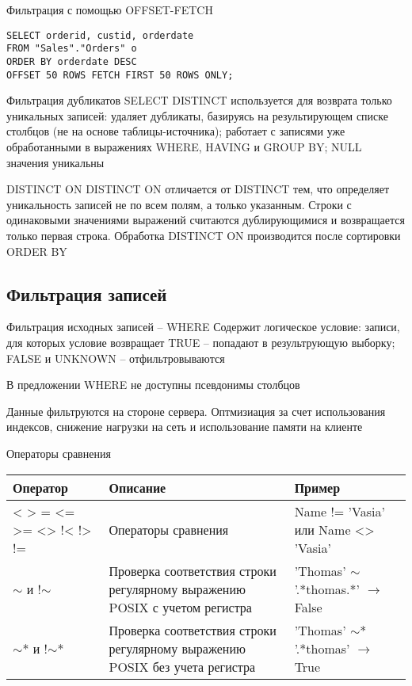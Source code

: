 \documentclass[12pt]{article}
\begin{document}
\begin{Example}{Фильтрация с помощью OFFSET-FETCH}
\begin{lstlisting}
SELECT orderid, custid, orderdate 
FROM "Sales"."Orders" o 
ORDER BY orderdate DESC 
OFFSET 50 ROWS FETCH FIRST 50 ROWS ONLY;
\end{lstlisting}
\end{Example}

\begin{nota}{Фильтрация дубликатов}
    SELECT DISTINCT используется для возврата только уникальных записей: удаляет дубликаты, базируясь на результирующем списке столбцов (не на основе таблицы-источника); работает с записями уже обработанными в выражениях WHERE, HAVING и GROUP BY; NULL значения уникальны 
\end{nota}

\begin{defin}{DISTINCT ON}
    DISTINCT ON отличается от DISTINCT тем, что определяет уникальность записей не по всем полям, а только указанным. Строки с одинаковыми значениями выражений считаются дублирующимися и возвращается только первая строка. Обработка DISTINCT ON производится после сортировки ORDER BY 
\end{defin}

\newpage

\subsection{Фильтрация записей}

\begin{defin}{Фильтрация исходных записей -- WHERE}
    Содержит логическое условие: записи, для которых условие возвращает TRUE -- попадают в результрующую выборку; FALSE и UNKNOWN -- отфильтровываются

    В предложении WHERE не доступны псевдонимы столбцов 

    Данные фильтруются на стороне сервера. Оптмизиация за счет использования индексов, снижение нагрузки на сеть и использование памяти на клиенте 
\end{defin}

\begin{nota}{Операторы сравнения}
    \begin{center}
        \begin{tabular}{|m{8em}|m{19em}|m{10em}|}
            \hline
            Оператор & Описание & Пример \\
            \hline
            < > = <= >= <> !< !> != & Операторы сравнения & Name != 'Vasia' или Name <> 'Vasia' \\ 
            \hline 
            $\sim$ и !$\sim$ & Проверка соответствия строки регулярному выражению POSIX с учетом регистра & 'Thomas' $\sim$ '.*thomas.*' $\to$ False \\
            \hline 
            $\sim$* и !$\sim$* & Проверка соответствия строки регулярному выражению POSIX без учета регистра & 'Thomas' $\sim$* '.*thomas' $\to$ True \\
            \hline
        \end{tabular}
    \end{center}
\end{nota}
\end{document}
